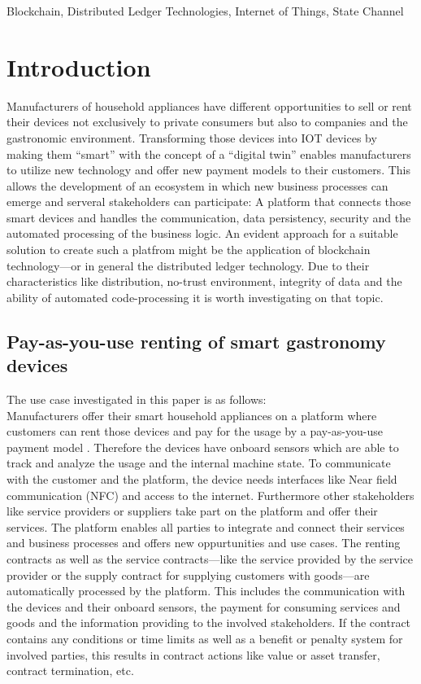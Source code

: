 \documentclass[conference]{IEEEtran}
\begin{document}
\begin{IEEEkeywords}
Blockchain, Distributed Ledger Technologies, Internet of Things, State Channel
\end{IEEEkeywords}


\section{Introduction}
Manufacturers of household appliances have different opportunities to sell or rent their devices not exclusively to private consumers but also to companies and the gastronomic environment. Transforming those devices into IOT devices by making them \enquote{smart} with the concept of a \enquote{digital twin} enables manufacturers to utilize new technology and offer new payment models to their customers. This allows the development of an ecosystem in which new business processes can emerge and serveral stakeholders can participate: A platform that connects those smart devices and handles the communication, data persistency, security and the automated processing of the business logic. An evident approach for a suitable solution to create such a platfrom might be the application of blockchain technology---or in general the distributed ledger technology. Due to their characteristics like distribution, no-trust environment, integrity of data and the ability of automated code-processing it is worth investigating on that topic.\\ 

\subsection{Pay-as-you-use renting of smart gastronomy devices}
The use case investigated in this paper is as follows:\\
Manufacturers offer their smart household appliances on a platform where customers can rent those devices and pay for the usage by a pay-as-you-use payment model \cite{PayPerWash2020}. Therefore the devices have onboard sensors which are able to track and analyze the usage and the internal machine state. To communicate with the customer and the platform, the device needs interfaces like Near field communication (NFC) and access to the internet. Furthermore other stakeholders like service providers or suppliers take part on the platform and offer their services. The platform enables all parties to integrate and connect their services and business processes and offers new oppurtunities and use cases. The renting contracts as well as the service contracts---like the service provided by the service provider or the supply contract for supplying customers with goods---are automatically processed by the platform. This includes the communication with the devices and their onboard sensors, the payment for consuming services and goods and the information providing to the involved stakeholders. If the contract contains any conditions or time limits as well as a benefit or penalty system for involved parties, this results in contract actions like value or asset transfer, contract termination, etc.\\
\end{document}
